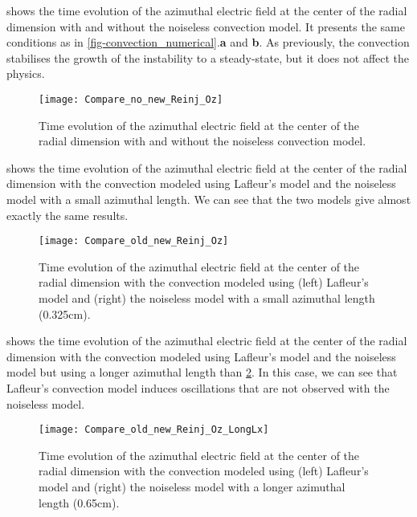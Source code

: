        shows the time  evolution of the azimuthal electric field at the center of the radial dimension with and without the noiseless convection model.
      It presents the same conditions as in \cref{fig-convection_numerical}.{\bf a} and {\bf b}. 
      As previously, the convection stabilises the growth of the instability to a steady-state, but it does not affect the physics.
       
      
      \begin{figure}[hbt]
        \centering
        \texttt{[image: Compare\_no\_new\_Reinj\_Oz]}
        \caption{Time evolution of the azimuthal electric field at the center of the radial dimension with and without the noiseless convection model. }
        \label{fig-newconv_noconv}
      \end{figure}
      
      
       shows the  time  evolution of the azimuthal electric field at the center of the radial dimension  with the convection modeled using Lafleur's model and the noiseless model with a small azimuthal length.
      We can see that the two models give almost exactly the same results.
      
      \begin{figure}[hbt]
        \centering
        \texttt{[image: Compare\_old\_new\_Reinj\_Oz]}
        \caption{Time evolution of the azimuthal electric field at the center of the radial dimension with the convection modeled using (left) Lafleur's model and (right) the noiseless model with a small azimuthal length (0.325cm).}
        \label{fig-oldeconv_newconv}
      \end{figure}
      
      
       shows the  time  evolution of the azimuthal electric field at the center of the radial dimension  with the convection modeled using Lafleur's model and the noiseless model but using a longer azimuthal length than \cref{fig-oldeconv_newconv}.
      In this case, we can see that Lafleur's convection model induces oscillations that are not observed with the noiseless model.
      
      \begin{figure}[hbt]
        \centering
        \texttt{[image: Compare\_old\_new\_Reinj\_Oz\_LongLx]}
        \label{fig-oldeconv_newconv_longLZ}
        \caption{Time evolution of the azimuthal electric field at the center of the radial dimension with the convection modeled using (left) Lafleur's model and (right) the noiseless model with a longer azimuthal length (0.65cm).}
      \end{figure}


